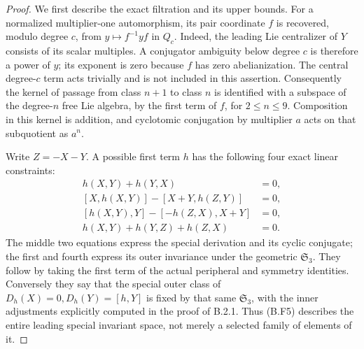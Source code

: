 \begin{proof}
We first describe the exact filtration and its upper bounds.
For a normalized multiplier-one automorphism, its pair coordinate
$f$ is recovered, modulo degree $c$, from
$y\mapsto f^{-1}yf$ in $Q_c$. Indeed, the leading Lie centralizer
of $Y$ consists of its scalar multiples. A conjugator ambiguity
below degree $c$ is therefore a power of $y$; its exponent is
zero because $f$ has zero abelianization. The central degree-$c$
term acts trivially and is not included in this assertion.
Consequently the kernel of passage from class $n+1$ to class $n$
is identified with a subspace of the degree-$n$ free Lie algebra,
by the first term of $f$, for $2\le n\le9$. Composition in this
kernel is addition, and cyclotomic conjugation by multiplier
$a$ acts on that subquotient as $a^n$.

Write $Z=-X-Y$. A possible first term $h$ has the following
four exact linear constraints:
\[
\begin{aligned}
 h(X,Y)+h(Y,X)&=0,\\
 [X,h(X,Y)]-[X+Y,h(Z,Y)]&=0,\\
 [h(X,Y),Y]-[-h(Z,X),X+Y]&=0,\\
 h(X,Y)+h(Y,Z)+h(Z,X)&=0.
\end{aligned}\tag{B.F5}
\]
The middle two equations express the special derivation and
its cyclic conjugate; the first and fourth express its outer
invariance under the geometric $\mathfrak S_3$. They follow by
taking the first term of the actual peripheral and symmetry
identities. Conversely they say that the special outer
class of $D_h(X)=0,D_h(Y)=[h,Y]$ is fixed by that same
$\mathfrak S_3$, with the inner adjustments explicitly
computed in the proof of B.2.1. Thus (B.F5) describes the
entire leading special invariant space, not merely a selected
family of elements of it.


\end{proof}
